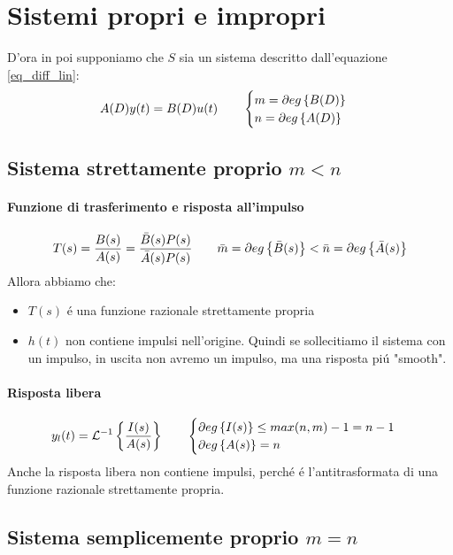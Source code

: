 \documentclass[../main.tex]{subfiles}
\begin{document}
	\section{Sistemi propri e impropri}
		D'ora in poi supponiamo che $ S $ sia un sistema descritto dall'equazione \ref{eq_diff_lin}:
		\[ 
			A(D) y(t) = B(D) u(t) \qquad 
			\begin{cases}
				m = \partial eg \left\lbrace B(D) \right\rbrace
				\\
				n=\partial eg \left\lbrace A(D) \right\rbrace
			\end{cases}
		\]
	
	\subsection{Sistema strettamente proprio $ m < n $}
		\paragraph{Funzione di trasferimento e risposta all'impulso}
			\[
				T(s) = \frac{B(s)}{A(s)} = \frac{\bar{B}(s) P(s)}{\bar{A}(s) P(s)} \qquad \bar{m} = \partial eg \left\lbrace \bar{B}(s) \right\rbrace < \bar{n} = \partial eg \left\lbrace \bar{A}(s) \right\rbrace
			\]
			Allora abbiamo che:
			\begin{itemize}
				\item
					$ T(s) $ \'{e} una funzione razionale strettamente propria
				\item
					$ h(t) $ non contiene impulsi nell'origine. Quindi se sollecitiamo il sistema con un impulso, in uscita non avremo un impulso, ma una risposta pi\'{u} "smooth".
			\end{itemize}
		\paragraph{Risposta libera}
			\[
				y_l(t) = \mathcal{L}^{-1} \left\lbrace \frac{I(s)}{A(s)} \right\rbrace \qquad 
				\begin{cases} 
					\partial eg \left\lbrace I(s) \right\rbrace \leq max(n,m) - 1 = n-1
					\\
					\partial eg \left\lbrace A(s) \right\rbrace = n 
				\end{cases} 
			\]
			Anche la risposta libera non contiene impulsi, perch\'e \'e l'antitrasformata di una funzione razionale strettamente propria.
	
	\subsection{Sistema semplicemente proprio $ m = n $}
\end{document}
